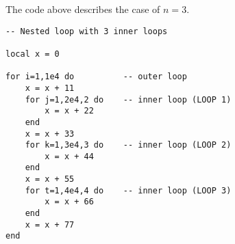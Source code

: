The code above describes the case of $n=3$.

\begin{mdframed}[style=LuaStyleFrame]
\begin{lstlisting}[style=LuaStyle]
-- Nested loop with 3 inner loops

local x = 0

for i=1,1e4 do          -- outer loop
	x = x + 11
    for j=1,2e4,2 do    -- inner loop (LOOP 1)
		x = x + 22
	end
	x = x + 33
    for k=1,3e4,3 do    -- inner loop (LOOP 2)
		x = x + 44 
	end
	x = x + 55
    for t=1,4e4,4 do    -- inner loop (LOOP 3)
		x = x + 66
	end
	x = x + 77 
end
\end{lstlisting}
\end{mdframed}

